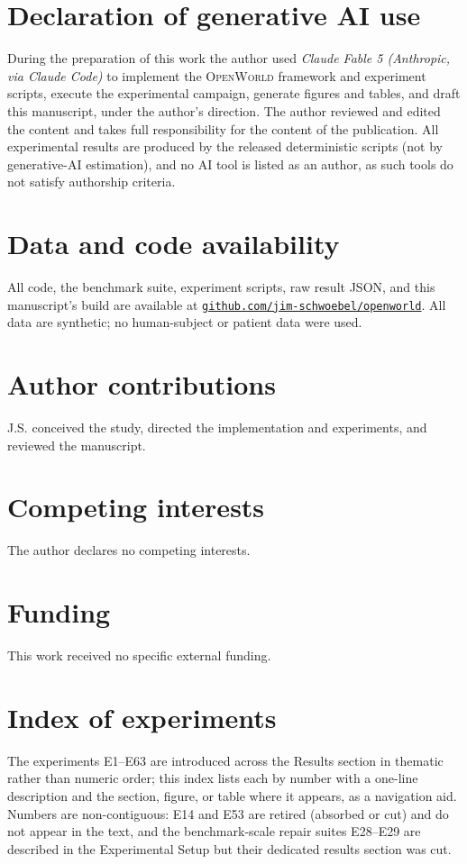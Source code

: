 \documentclass[11pt]{article}
\newcommand{\openworld}{\textsc{OpenWorld}}
\begin{document}
\section*{Declaration of generative AI use}
During the preparation of this work the author used \emph{Claude Fable 5
(Anthropic, via Claude Code)} to implement the \openworld{} framework and
experiment scripts, execute the experimental campaign, generate figures and
tables, and draft this manuscript, under the author's direction. The author
reviewed and edited the content and takes full responsibility for the content
of the publication. All experimental results are produced by the released
deterministic scripts (not by generative-AI estimation), and no AI tool is
listed as an author, as such tools do not satisfy authorship criteria.

\section*{Data and code availability}
All code, the benchmark suite, experiment scripts, raw result JSON, and this
manuscript's build are available at
\href{https://github.com/jim-schwoebel/openworld}{\nolinkurl{github.com/jim-schwoebel/openworld}}.
All data are synthetic; no human-subject or patient data were used.

\section*{Author contributions}
J.S. conceived the study, directed the implementation and experiments, and
reviewed the manuscript.

\section*{Competing interests}
The author declares no competing interests.

\section*{Funding}
This work received no specific external funding.

\appendix
\section{Index of experiments}\label{app:experiment-index}
The experiments E1--E63 are introduced across the Results section in thematic
rather than numeric order; this index lists each by number with a one-line
description and the section, figure, or table where it appears, as a navigation
aid. Numbers are non-contiguous: E14 and E53 are retired (absorbed or cut) and
do not appear in the text, and the benchmark-scale repair suites E28--E29 are
described in the Experimental Setup but their dedicated results section was cut.
\end{document}
